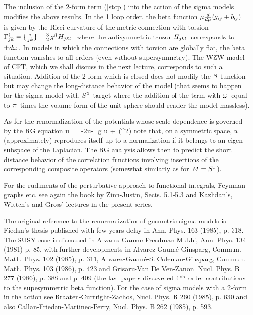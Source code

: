 The inclusion of the 2-form term (\ref{stop})
into the action of the sigma models
modifies the above results. In the 1
loop order, the beta function $\mu{d\over d\mu}(g_{ij}+b_{ij})\hspace{0.05cm}$
is given by the Ricci
curvature of the metric connection with torsion
\s\s$\Ga^i_{jk}=\{{i\atop{jk}}\}
+{3\over 2}\m g^{il}\m H_{jkl}\s\s$ where
the antisymmetric tensor \s$H_{jkl}\hspace{0.05cm}$ corresponds
to \s$\pm d\omega\hspace{0.05cm}$. In models in which the connections
with torsion are globally flat, the beta function vanishes to
all orders (even without supersymmetry). The WZW model
of CFT, which we shall discuss in the next lecture, corresponds
to such a situation. Addition of the 2-form
which is closed does not modify the \s$\beta\hspace{0.05cm}$ function
but may change the long-distance behavior of the model
(that seems to happen for the sigma model with
\s$S^2\hspace{0.05cm}$ target where the addition of the term
with \s$\omega\hspace{0.05cm}$ equal to \s$\pi\hspace{0.05cm}$ times
the volume form of the unit sphere should render
the model massless).
\vskip 0.4cm

As for the renormalization of the potentials whose
scale-dependence is governed by the RG equation
\qq
\mu{}\s u\ =\ -2u\s-\s\hh\s\Delta_g u
\s\s+\ \CO({\hh}^2)
\non
\qqq
note that, on a symmetric space, \s$u\hspace{0.05cm}$ (approximately)
reproduces itself up to a normalization if it belongs to
an eigen-subspace of the Laplacian.
The RG analysis allows then to predict the
short distance behavior of the correlation functions
involving insertions of the corresponding composite operators
(somewhat similarly as for \s$M=S^1\hspace{0.05cm}$).
\vskip 0.8cm

\vskip 0.4cm

For the rudiments of the perturbative approach to functional
integrals, Feynman graphs etc. see again the book by Zinn-Justin,
Sects. 5.1-5.3 and Kazhdan's, Witten's and Gross' lectures in the
present series.
\vskip 0.3cm

The original reference to the renormalization of
geometric sigma models is Fiedan's thesis published with few
years delay in Ann. Phys. 163 (1985), p. 318. The SUSY case
is discussed in Alvarez-Gaume-Freedman-Mukhi, Ann. Phys. 134 (1981)
p. 85, with further developments in Alvarez-Gaum\'{e}-Ginsparg,
Commun. Math. Phys. {102} (1985), p. 311, Alvarez-Gaum\'{e}-S.
Coleman-Ginsparg, Commun. Math. Phys. {103} (1986), p. 423 and
Grisaru-Van De Ven-Zanon, Nucl. Phys. {B 277} (1986), p. 388 and p. 409
(the last papers discovered 4$^{\hspace{0.025cm}\rm th}$ order contributions
to the supesymmetric beta function). For the case of sigma models
with a 2-form in the action see Braaten-Curtright-Zachos, Nucl. Phys.
{B 260} (1985), p. 630 and also Callan-Friedan-Martinec-Perry, Nucl.
Phys. B 262 (1985), p. 593.
\eject


